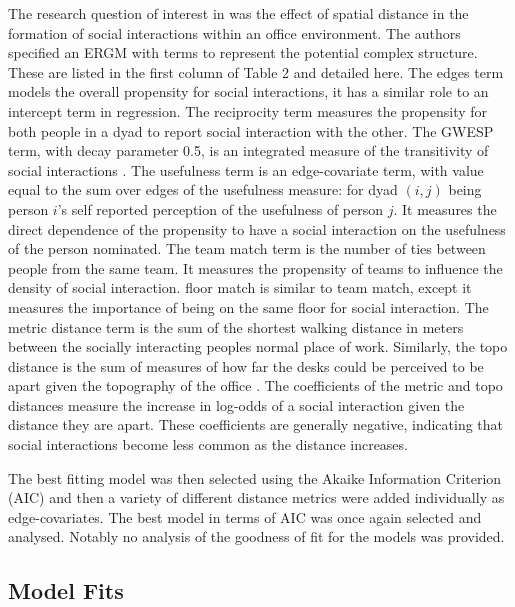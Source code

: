 \documentclass[
]{statsoc}
\begin{document}
The research question of interest in \cite{Sailer2012} was the effect of
spatial distance in the formation of social interactions within an
office environment. The authors specified an ERGM with terms to
represent the potential complex structure. These are listed in the first
column of Table 2 and detailed here. The edges term models the overall
propensity for social interactions, it has a similar role to an
intercept term in regression. The reciprocity term measures the
propensity for both people in a dyad to report social interaction with
the other. The GWESP term, with decay parameter 0.5, is an integrated
measure of the transitivity of social interactions
\citep[See][for a detailed
explanation]{snijders2006}. The usefulness term is an edge-covariate
term, with value equal to the sum over edges of the usefulness measure:
for dyad \((i,j)\) being person \(i\)'s self reported perception of the
usefulness of person \(j\). It measures the direct dependence of the
propensity to have a social interaction on the usefulness of the person
nominated. The team match term is the number of ties between people from
the same team. It measures the propensity of teams to influence the
density of social interaction. floor match is similar to team match,
except it measures the importance of being on the same floor for social
interaction. The metric distance term is the sum of the shortest walking
distance in meters between the socially interacting peoples normal place
of work. Similarly, the topo distance is the sum of measures of how far
the desks could be perceived to be apart given the topography of the
office \citep[See][for precise definitions]{Sailer2012}. The
coefficients of the metric and topo distances measure the increase in
log-odds of a social interaction given the distance they are apart.
These coefficients are generally negative, indicating that social
interactions become less common as the distance increases.

The best fitting model was then selected using the Akaike Information
Criterion (AIC) and then a variety of different distance metrics were
added individually as edge-covariates. The best model in terms of AIC
was once again selected and analysed. Notably no analysis of the
goodness of fit for the models was provided.

\subsection{Model Fits}
\end{document}
